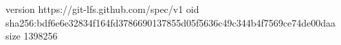 version https://git-lfs.github.com/spec/v1
oid sha256:bdf6e6e32834f164fd3786690137855d05f5636c49c344b4f7569ce74de00daa
size 1398256
